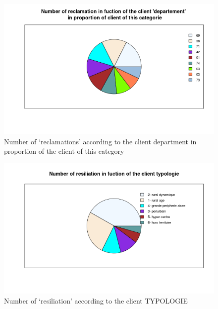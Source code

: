 \documentclass[a4paper, 11pt]{article}
\begin{document}
    \begin{figure}[!ht]
    	\centering
            \includegraphics[height = 10 cm]{Valentin/Number_of_reclamation_in_fuction_of_the_client_departement_proportion.png}
            \caption{Number of `reclamations' according to the client department in proportion of the client of this category}
            \label{fig:reclamtion_dep3}
    \end{figure}
    
    

    \begin{figure}[!ht]
    	\centering
            \includegraphics[height = 10 cm]{Valentin/Number_of_resiliation_in_fuction_of_the_client_typologie.png}
            \caption{Number of `resiliation' according to the client TYPOLOGIE}
            \label{fig:resiliation_typo1}
    \end{figure}
    
\end{document}
